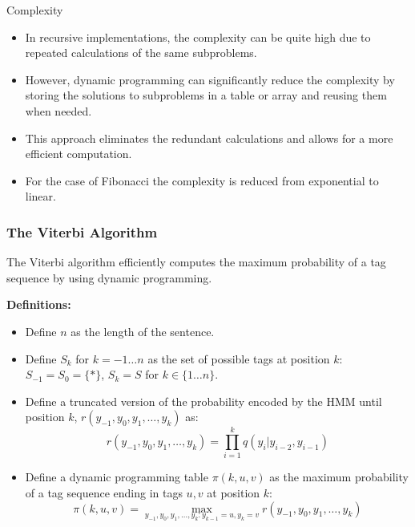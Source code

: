 \documentclass[handout]{beamer}
\begin{document}
\begin{frame}{Complexity}
\scriptsize

  \begin{itemize}
  
  \item In recursive implementations, the complexity can be quite high due to repeated calculations of the same subproblems. 
  \item However, dynamic programming can significantly reduce the complexity by storing the solutions to subproblems in a table or array and reusing them when needed. 
  \item This approach eliminates the redundant calculations and allows for a more efficient computation.
  \item For the case of Fibonacci the complexity is reduced from exponential to linear. 
  \end{itemize}

\end{frame}



\begin{frame}
  \frametitle{The Viterbi Algorithm}
  \scriptsize
  The Viterbi algorithm efficiently computes the maximum probability of a tag sequence by using dynamic programming.

  \textbf{Definitions:}
  \begin{itemize}
    \item Define $n$ as the length of the sentence.
    \item Define $S_k$ for $k = -1 \ldots n$ as the set of possible tags at position $k$: $S_{-1} = S_0 = \{*\}$, $S_k = S$ for $k \in \{1 \ldots n\}$.
\item Define a truncated version of the probability encoded by the HMM until position $k$, $r(y_{-1}, y_0, y_1, \ldots, y_k)$ as:
  \[
    r(y_{-1}, y_0, y_1, \ldots, y_k) = \prod_{i=1}^{k} q(y_i | y_{i-2}, y_{i-1})
  \]
  
  \item Define a dynamic programming table $\pi(k, u, v)$ as the maximum probability of a tag sequence ending in tags $u, v$ at position $k$:
  \[
    \pi(k, u, v) = \max_{y_{-1}, y_0, y_1, \ldots, y_k : y_{k-1} = u, y_k = v} r(y_{-1}, y_0, y_1, \ldots, y_k)
  \]
  \end{itemize}
\end{frame}
\end{document}
